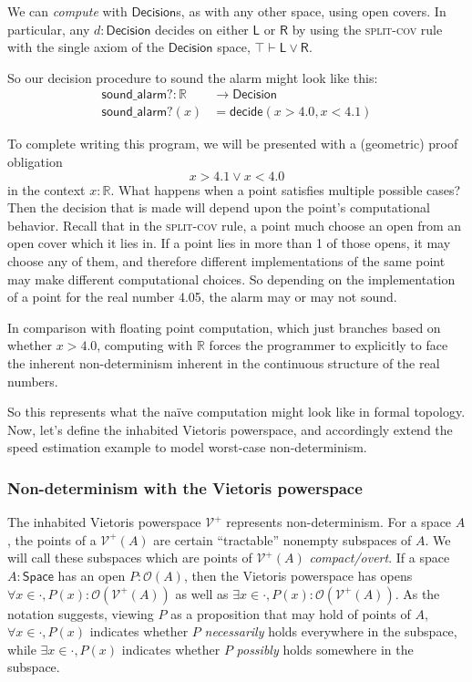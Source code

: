 \documentclass{article}           %
\newcommand{\R}{\mathbb{R}}
\newcommand{\Open}[1]{\mathcal{O}({#1})}
\newcommand{\irule}[1]{\textsc{#1}}
\newcommand{\Space}{\mathsf{Space}}
\newcommand{\Viet}{{\mathcal{V}^+}}
\begin{document}
We can \emph{compute} with $\mathsf{Decision}$s, as with any other space, using open covers. In particular, any $d : \mathsf{Decision}$ decides on either $\mathsf{L}$ or $\mathsf{R}$ by using the \irule{split-cov} rule with the single axiom of the $\mathsf{Decision}$ space, $\top \vdash \mathsf{L} \vee \mathsf{R}$.

So our decision procedure to sound the alarm might look like this:
\begin{align*}
\mathsf{sound\_alarm?} : \R &\to \mathsf{Decision}
\\ \mathsf{sound\_alarm?}(x) &= \mathsf{decide}(x > 4.0, x < 4.1)
\end{align*}

To complete writing this program, we will be presented with a (geometric) proof obligation
\[
x > 4.1 \vee x < 4.0
\]
in the context $x : \R$. What happens when a point satisfies multiple possible cases? Then the decision that is made will depend upon the point's computational behavior. Recall that in the \irule{split-cov} rule, a point much choose an open from an open cover which it lies in. If a point lies in more than 1 of those opens, it may choose any of them, and therefore different implementations of the same point may make different computational choices. So depending on the implementation of a point for the real number 4.05, the alarm may or may not sound.

In comparison with floating point computation, which just branches based on whether $x > 4.0$, computing with $\R$ forces the programmer to explicitly to face the inherent non-determinism inherent in the continuous structure of the real numbers.

So this represents what the naïve computation might look like in formal topology. Now, let's define the inhabited Vietoris powerspace, and accordingly extend the speed estimation example to model worst-case non-determinism.

\subsubsection{Non-determinism with the Vietoris powerspace}

The inhabited Vietoris powerspace $\Viet$ represents non-determinism. For a space $A$, the points of a $\Viet(A)$ are certain ``tractable'' nonempty subspaces of $A$. We will call these subspaces which are points of $\Viet(A)$ \emph{compact/overt}. If a space $A : \Space$ has an open $P : \Open{A}$, then the Vietoris powerspace has opens $\forall x \in \cdot, P(x) : \Open{\Viet(A)}$ as well as $\exists x \in \cdot, P(x) : \Open{\Viet(A)}$. As the notation suggests, viewing $P$ as a proposition that may hold of points of $A$, $\forall x \in \cdot, P(x)$ indicates whether $P$ \emph{necessarily} holds everywhere in the subspace, while $\exists x \in \cdot, P(x)$ indicates whether $P$ \emph{possibly} holds somewhere in the subspace. 
\end{document}
